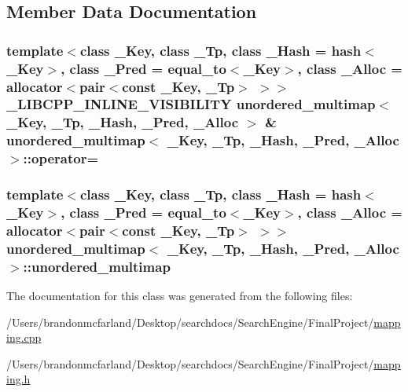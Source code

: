 \subsection{Member Data Documentation}
\hypertarget{classunordered__multimap_ad2926274cc9380feb875e99003f42a77}{}
\subsubsection[{operator=}]{\setlength{\rightskip}{0pt plus 5cm}template$<$class \+\_\+\+Key, class \+\_\+\+Tp, class \+\_\+\+Hash = hash$<$\+\_\+\+Key$>$, class \+\_\+\+Pred = equal\+\_\+to$<$\+\_\+\+Key$>$, class \+\_\+\+Alloc = allocator$<$pair$<$const \+\_\+\+Key, \+\_\+\+Tp$>$ $>$$>$ \+\_\+\+L\+I\+B\+C\+P\+P\+\_\+\+I\+N\+L\+I\+N\+E\+\_\+\+V\+I\+S\+I\+B\+I\+L\+I\+T\+Y {\bf unordered\+\_\+multimap}$<$ \+\_\+\+Key, \+\_\+\+Tp, \+\_\+\+Hash, \+\_\+\+Pred, \+\_\+\+Alloc $>$ \& {\bf unordered\+\_\+multimap}$<$ \+\_\+\+Key, \+\_\+\+Tp, \+\_\+\+Hash, \+\_\+\+Pred, \+\_\+\+Alloc $>$\+::operator=\hspace{0.3cm}{\ttfamily [inline]}}\label{classunordered__multimap_ad2926274cc9380feb875e99003f42a77}
\hypertarget{classunordered__multimap_adbbf07ec1c79d182c91c7925502cd69b}{}
\subsubsection[{unordered\+\_\+multimap}]{\setlength{\rightskip}{0pt plus 5cm}template$<$class \+\_\+\+Key, class \+\_\+\+Tp, class \+\_\+\+Hash = hash$<$\+\_\+\+Key$>$, class \+\_\+\+Pred = equal\+\_\+to$<$\+\_\+\+Key$>$, class \+\_\+\+Alloc = allocator$<$pair$<$const \+\_\+\+Key, \+\_\+\+Tp$>$ $>$$>$ {\bf unordered\+\_\+multimap}$<$ \+\_\+\+Key, \+\_\+\+Tp, \+\_\+\+Hash, \+\_\+\+Pred, \+\_\+\+Alloc $>$\+::{\bf unordered\+\_\+multimap}\hspace{0.3cm}{\ttfamily [inline]}}\label{classunordered__multimap_adbbf07ec1c79d182c91c7925502cd69b}


The documentation for this class was generated from the following files\+:\begin{DoxyCompactItemize}
\item 
/\+Users/brandonmcfarland/\+Desktop/searchdocs/\+Search\+Engine/\+Final\+Project/\hyperlink{mapping_8cpp}{mapping.\+cpp}\item 
/\+Users/brandonmcfarland/\+Desktop/searchdocs/\+Search\+Engine/\+Final\+Project/\hyperlink{mapping_8h}{mapping.\+h}\end{DoxyCompactItemize}
